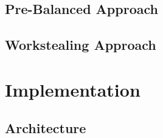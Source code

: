 \subsection{Pre-Balanced Approach}

\subsection{Workstealing Approach}

\section{Implementation}

\subsection{Architecture}
